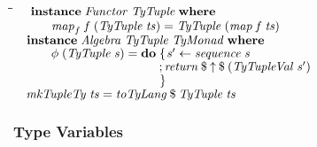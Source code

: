 \documentclass[10pt]{article}
\newlength{\lwidth}\setlength{\lwidth}{4.5cm}
\newlength{\cwidth}\setlength{\cwidth}{8mm} %
\newcommand{\Conid}[1]{\mathit{#1}}
\newcommand{\Varid}[1]{\mathit{#1}}
\begin{document}
\begin{tabbing}
\qquad\=\hspace{\lwidth}\=\hspace{\cwidth}\=\+\kill
${\hskip1.00em\relax\mathbf{instance}\;\Conid{Functor}\;\Conid{TyTuple}\;\mathbf{where}}$\\
${\hskip1.00em\relax\hskip2.00em\relax\Varid{map}_{f}\;\Varid{f}\;(\Conid{TyTuple}\;\Varid{ts})\mathrel{=}\Conid{TyTuple}\;(\Varid{map}\;\Varid{f}\;\Varid{ts})}$\\
${}$\\
${\hskip1.00em\relax\mathbf{instance}\;\Conid{Algebra}\;\Conid{TyTuple}\;\Conid{TyMonad}\;\mathbf{where}}$\\
${\hskip1.00em\relax\hskip2.00em\relax\Varid{\phi}\;(\Conid{TyTuple}\;\Varid{s})\mathrel{=}\mathbf{do}\;\{\mskip1.5mu \Varid{s'}\leftarrow \Varid{sequence}\;\Varid{s}}$\\
${\hskip1.00em\relax\hskip2.00em\relax\phantom{\Varid{\phi}\;(\Conid{TyTuple}\;\Varid{s})\mathrel{=}\mathbf{do}\;\mbox{}};\Varid{return}\mathbin{\$}\Varid{\uparrow}\mathbin{\$}(\Conid{TyTupleVal}\;\Varid{s'})}$\\
${\hskip1.00em\relax\hskip2.00em\relax\phantom{\Varid{\phi}\;(\Conid{TyTuple}\;\Varid{s})\mathrel{=}\mathbf{do}\;\mbox{}}\mskip1.5mu\}}$\\
${}$\\
${\hskip1.00em\relax\Varid{mkTupleTy}\;\Varid{ts}\mathrel{=}\Varid{toTyLang}\mathbin{\$}\Conid{TyTuple}\;\Varid{ts}}$
\end{tabbing}
\subsubsection{Type Variables}
\end{document}
